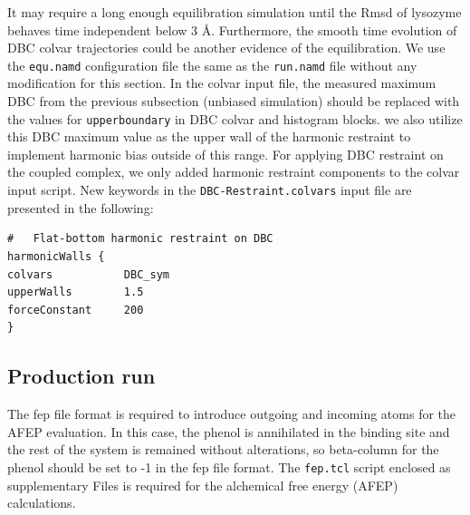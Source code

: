 \documentclass[9pt,tutorial]{livecoms}
\begin{document}
It may require a long enough equilibration simulation until the Rmsd of lysozyme behaves time independent below 3 {\AA}. Furthermore, the smooth time evolution of DBC colvar trajectories could be another evidence of the equilibration. We use the \texttt{equ.namd} configuration file the same as the \texttt{run.namd} file without any modification for this section. In the colvar input file, the measured maximum DBC from the previous subsection (unbiased simulation) should be replaced with the values for \texttt{upperboundary} in DBC colvar and histogram blocks. we also utilize this DBC maximum value as the upper wall of the harmonic restraint to implement harmonic bias outside of this range. For applying DBC restraint on the coupled complex, we only added harmonic restraint components to the colvar input script. New keywords in the \texttt{DBC-Restraint.colvars} input file are presented in the following:
\begin{verbatim}
#   Flat-bottom harmonic restraint on DBC 
harmonicWalls {
colvars           DBC_sym
upperWalls        1.5
forceConstant     200
}
\end{verbatim}

\subsection{Production run}

The fep file format is required to introduce outgoing and incoming atoms for the AFEP evaluation. In this case, the phenol is annihilated in the binding site and the rest of the system is remained without alterations, so beta-column for the phenol should be set to -1 in the fep file format. The \texttt{fep.tcl} script enclosed as supplementary Files is required for the alchemical free energy (AFEP) calculations.
\end{document}
